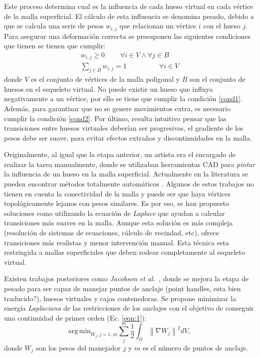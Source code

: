 Este proceso  determina cual es la influencia de cada hueso virtual en cada vértice de la malla superficial. El cálculo de esta influencia se denomina pesado, debido a que se calcula una serie de pesos $w_{i,j}$ que relacionan un vértice $i$ con el hueso $j$.
Para asegurar una deformación correcta se presuponen las siguientes condiciones que tienen se tienen que cumplir:
\begin{eqnarray}
\label{cond1}
w_{i,j}\geq 0 \;\;\;\;\;\;\;\; \forall i \in V \wedge \forall j \in B   \\
\label{cond2}
\sum_{j \in B} w_{i,j} = 1\ \;\;\;\;\;\;\;\;\;\;\;\;\;\;\;\;
\forall i \in V
\end{eqnarray}
donde $V$ es el conjunto de vértices de la malla poligonal y $B$ son el conjunto de huesos en el esqueleto virtual. No puede existir un hueso que influya negativamente a un vértice, por ello se tiene que cumplir la condición \ref{cond1}. Además, para garantizar que no se genere movimientos extra, es necesario cumplir la condición \ref{cond2}.
Por último, resulta intuitivo pensar que las transiciones entre huesos virtuales deberían ser progresivas, el gradiente de los pesos debe ser suave, para evitar efectos extraños y discontinuidades en la malla.

Originalmente, al igual que la etapa anterior, un artista era el encargado de realizar la tarea manualmente, donde se utilizaban herramientas \ac{CAD} para \emph{pintar} la influencia de un hueso en la malla superficial. Actualmente en la literatura se pueden encontrar métodos totalmente automáticos \cite{huang2013robust,pan2017automatic}. 
Algunos de estos trabajos no tienen en cuenta la conectividad de la malla y puede ser que haya vértices topológicamente lejanos con pesos similares. Es por eso, se han propuesto soluciones como \cite{Baran:2007} utilizando la ecuación de \emph{Laplace} que ayudan a calcular transiciones más suaves en la malla. Aunque esta solución es más compleja (resolución de sistemas de ecuaciones, cálculo de vecindad, etc), ofrece transiciones más realistas y menor intervención manual. Esta técnica esta restringida a mallas superficiales que deben rodear completamente al esqueleto virtual.

Existen trabajos posteriores como \emph{Jacobson et al.}~\cite{Jacobson:2011}, donde se mejora la etapa de pesado para ser capaz de manejar puntos de anclaje (point handles, esta bien traducido?), huesos virtuales y cajas contenedoras. Se propone minimizar la energía \emph{Laplaciana} de las restricciones de los anclajes con el objetivo de conseguir una continuidad  de primer orden (Ec. \ref{eqn:1}):
\begin{equation}
\label{eqn:1}
\mathrm{arg\,min}_{W_j, j=1..m}\sum_{j}^m\frac{1}{2}\int_\Omega \left \|  \nabla W_j\right \|^2 dV,
\end{equation}
donde $W_j$ son los pesos del manejador $j$ y $m$ es el número de puntos de anclaje. 

